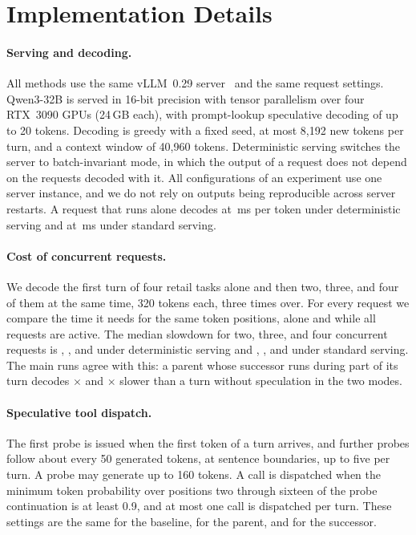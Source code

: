 \section{Implementation Details}
\label{app:impl}

\paragraph{Serving and decoding.}
All methods use the same vLLM~0.29 server~\citep{kwon2023vllm} and the same request settings.
Qwen3-32B is served in 16-bit precision with tensor parallelism over four RTX~3090 GPUs (24\,GB each), with prompt-lookup speculative decoding of up to 20 tokens.
Decoding is greedy with a fixed seed, at most 8{,}192 new tokens per turn, and a context window of 40{,}960 tokens.
Deterministic serving switches the server to batch-invariant mode, in which the output of a request does not depend on the requests decoded with it.
All configurations of an experiment use one server instance, and we do not rely on outputs being reproducible across server restarts.
A request that runs alone decodes at \SpdDetMsSolo\,ms per token under deterministic serving and at \SpdStdMsSolo\,ms under standard serving.

\paragraph{Cost of concurrent requests.}
We decode the first turn of four retail tasks alone and then two, three, and four of them at the same time, 320 tokens each, three times over.
For every request we compare the time it needs for the same token positions, alone and while all requests are active.
The median slowdown for two, three, and four concurrent requests is \ConDetTwo, \ConDetThree, and \ConDetFour{} under deterministic serving and \ConStdTwo, \ConStdThree, and \ConStdFour{} under standard serving.
The main runs agree with this: a parent whose successor runs during part of its turn decodes \SpdDetBusyRatio$\times$ and \SpdStdBusyRatio$\times$ slower than a turn without speculation in the two modes.

\paragraph{Speculative tool dispatch.}
The first probe is issued when the first token of a turn arrives, and further probes follow about every 50 generated tokens, at sentence boundaries, up to five per turn.
A probe may generate up to 160 tokens.
A call is dispatched when the minimum token probability over positions two through sixteen of the probe continuation is at least 0.9, and at most one call is dispatched per turn.
These settings are the same for the baseline, for the parent, and for the successor.

